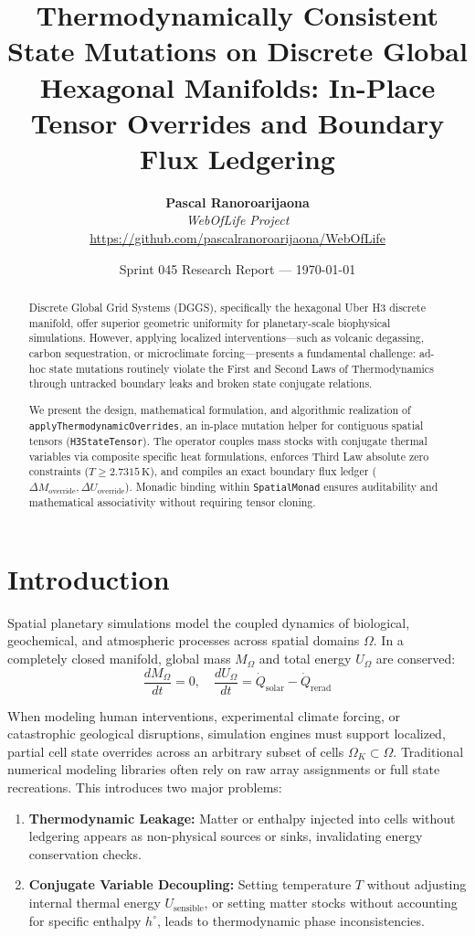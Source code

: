 \documentclass[twocolumn,10pt]{article}
\title{\textbf{Thermodynamically Consistent State Mutations on Discrete Global Hexagonal Manifolds: In-Place Tensor Overrides and Boundary Flux Ledgering}}
\author{
  \textbf{Pascal Ranoroarijaona}\\
  \textit{WebOfLife Project}\\
  \url{https://github.com/pascalranoroarijaona/WebOfLife}
}
\date{Sprint 045 Research Report --- \today}
\begin{document}
\maketitle

\begin{abstract}
Discrete Global Grid Systems (DGGS), specifically the hexagonal Uber H3 discrete manifold, offer superior geometric uniformity for planetary-scale biophysical simulations. However, applying localized interventions---such as volcanic degassing, carbon sequestration, or microclimate forcing---presents a fundamental challenge: ad-hoc state mutations routinely violate the First and Second Laws of Thermodynamics through untracked boundary leaks and broken state conjugate relations. 

We present the design, mathematical formulation, and algorithmic realization of \texttt{applyThermodynamicOverrides}, an in-place mutation helper for contiguous spatial tensors (\texttt{H3StateTensor}). The operator couples mass stocks with conjugate thermal variables via composite specific heat formulations, enforces Third Law absolute zero constraints ($T \ge 2.7315\,\text{K}$), and compiles an exact boundary flux ledger ($\Delta M_{\text{override}}, \Delta U_{\text{override}}$). Monadic binding within \texttt{SpatialMonad} ensures auditability and mathematical associativity without requiring tensor cloning.
\end{abstract}

\section{Introduction}
Spatial planetary simulations model the coupled dynamics of biological, geochemical, and atmospheric processes across spatial domains $\Omega$. In a completely closed manifold, global mass $M_\Omega$ and total energy $U_\Omega$ are conserved:
\begin{equation}
\frac{dM_{\Omega}}{dt} = 0, \quad \frac{dU_{\Omega}}{dt} = \dot{Q}_{\text{solar}} - \dot{Q}_{\text{rerad}}
\end{equation}

When modeling human interventions, experimental climate forcing, or catastrophic geological disruptions, simulation engines must support localized, partial cell state overrides across an arbitrary subset of cells $\Omega_K \subset \Omega$. Traditional numerical modeling libraries often rely on raw array assignments or full state recreations. This introduces two major problems:
\begin{enumerate}
    \item \textbf{Thermodynamic Leakage:} Matter or enthalpy injected into cells without ledgering appears as non-physical sources or sinks, invalidating energy conservation checks.
    \item \textbf{Conjugate Variable Decoupling:} Setting temperature $T$ without adjusting internal thermal energy $U_{\text{sensible}}$, or setting matter stocks without accounting for specific enthalpy $h^\circ$, leads to thermodynamic phase inconsistencies.
\end{enumerate}
\end{document}
